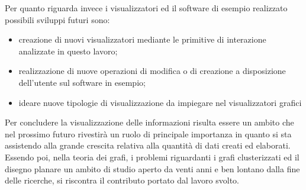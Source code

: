 {Per quanto riguarda invece i visualizzatori ed il software di esempio realizzato possibili sviluppi futuri sono:
\begin{itemize}
	\item creazione di nuovi visualizzatori mediante le primitive di interazione analizzate in questo lavoro;
	\item realizzazione di nuove operazioni di modifica o di creazione a disposizione dell'utente sul software in esempio;
	\item ideare nuove tipologie di visualizzazione da impiegare nel visualizzatori grafici
\end{itemize}
Per concludere la visualizzazione delle informazioni risulta essere un ambito che nel prossimo futuro rivestirà un ruolo di principale importanza in quanto si sta assistendo alla grande crescita relativa alla quantità di dati creati ed elaborati. Essendo poi, nella teoria dei grafi, i problemi riguardanti i grafi clusterizzati ed il disegno planare un ambito di studio aperto da venti anni e ben lontano dalla fine delle ricerche, si riscontra il contributo portato dal lavoro svolto.
}
